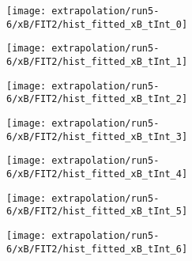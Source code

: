 \begin{figure}
	\centering
	\caption{Fit to the flask subtracted yield ratio with FIT2 for $x_B$ for run 5-6.}
	\label{fig:run5-6_FIT2_xB}
	\begin{subfigure}{0.45\linewidth}
		\texttt{[image: extrapolation/run5-6/xB/FIT2/hist\_fitted\_xB\_tInt\_0]}
	\end{subfigure}
	\begin{subfigure}{0.45\linewidth}
		\texttt{[image: extrapolation/run5-6/xB/FIT2/hist\_fitted\_xB\_tInt\_1]}
	\end{subfigure}
	\begin{subfigure}{0.45\linewidth}
		\texttt{[image: extrapolation/run5-6/xB/FIT2/hist\_fitted\_xB\_tInt\_2]}
	\end{subfigure}
	\begin{subfigure}{0.45\linewidth}
		\texttt{[image: extrapolation/run5-6/xB/FIT2/hist\_fitted\_xB\_tInt\_3]}
	\end{subfigure}
	\begin{subfigure}{0.45\linewidth}
		\texttt{[image: extrapolation/run5-6/xB/FIT2/hist\_fitted\_xB\_tInt\_4]}
	\end{subfigure}
	\begin{subfigure}{0.45\linewidth}
		\texttt{[image: extrapolation/run5-6/xB/FIT2/hist\_fitted\_xB\_tInt\_5]}
	\end{subfigure}
	\begin{subfigure}{0.45\linewidth}
		\texttt{[image: extrapolation/run5-6/xB/FIT2/hist\_fitted\_xB\_tInt\_6]}
	\end{subfigure}
\end{figure}
